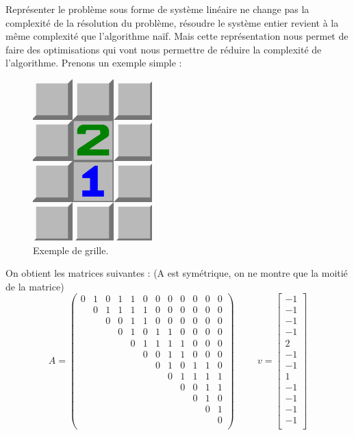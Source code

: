 Représenter le problème sous forme de système linéaire ne change pas la complexité de la résolution du problème, résoudre le système entier revient à la même complexité que l'algorithme naïf.
Mais cette représentation nous permet de faire des optimisations qui vont nous permettre de réduire la complexité de l'algorithme.
\newline
\newline
Prenons un exemple simple :

\begin{figure}[!htpb]
    \centering
    \includegraphics[width=0.2\linewidth]{Figures/exemple-board.png}
    \caption[Exemple de grille]{Exemple de grille.}
    \label{fig:exemple-board}
\end{figure}

On obtient les matrices suivantes : (A est symétrique, on ne montre que la moitié de la matrice)
\[
    A = \begin{pmatrix}
        0 & 1 & 0 & 1 & 1 & 0 & 0 & 0 & 0 & 0 & 0 & 0 \\
          & 0 & 1 & 1 & 1 & 1 & 0 & 0 & 0 & 0 & 0 & 0 \\
          &   & 0 & 0 & 1 & 1 & 0 & 0 & 0 & 0 & 0 & 0 \\
          &   &   & 0 & 1 & 0 & 1 & 1 & 0 & 0 & 0 & 0 \\
          &   &   &   & 0 & 1 & 1 & 1 & 1 & 0 & 0 & 0 \\
          &   &   &   &   & 0 & 0 & 1 & 1 & 0 & 0 & 0 \\
          &   &   &   &   &   & 0 & 1 & 0 & 1 & 1 & 0 \\
          &   &   &   &   &   &   & 0 & 1 & 1 & 1 & 1 \\
          &   &   &   &   &   &   &   & 0 & 0 & 1 & 1 \\
          &   &   &   &   &   &   &   &   & 0 & 1 & 0 \\
          &   &   &   &   &   &   &   &   &   & 0 & 1 \\
          &   &   &   &   &   &   &   &   &   &   & 0 \\
    \end{pmatrix}
    \hspace{1cm}
    v = \begin{bmatrix} -1 \\-1 \\-1 \\-1 \\2 \\-1 \\ -1 \\1 \\-1 \\-1 \\-1 \\-1 \\ \end{bmatrix}
\]

